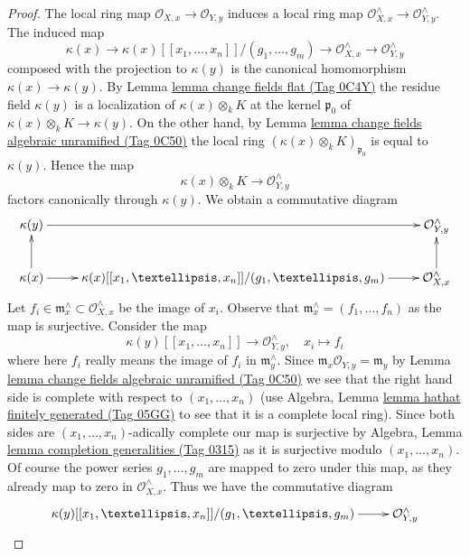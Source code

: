 \documentclass{amsart}
\theoremstyle{plain}
\theoremstyle{definition}
\theoremstyle{remark}
\numberwithin{equation}{subsection}
\begin{document}
\begin{proof}
The local ring map $\mathcal{O}_{X, x} \to \mathcal{O}_{Y, y}$
induces a local ring map
$\mathcal{O}_{X, x}^\wedge \to \mathcal{O}_{Y, y}^\wedge$.
The induced map
$$
\kappa(x) \to \kappa(x)[[x_1, \ldots, x_n]]/(g_1, \ldots, g_m)
\to \mathcal{O}_{X, x}^\wedge \to \mathcal{O}_{Y, y}^\wedge
$$
composed with the projection to $\kappa(y)$ is the canonical
homomorphism $\kappa(x) \to \kappa(y)$.
By Lemma \href{https://stacks.math.columbia.edu/tag/0C4Y}{lemma change fields flat (Tag 0C4Y)} the residue field
$\kappa(y)$ is a localization of $\kappa(x) \otimes_k K$
at the kernel $\mathfrak p_0$ of $\kappa(x) \otimes_k K \to \kappa(y)$.
On the other hand, by Lemma \href{https://stacks.math.columbia.edu/tag/0C50}{lemma change fields algebraic unramified (Tag 0C50)}
the local ring $(\kappa(x) \otimes_k K)_{\mathfrak p_0}$
is equal to $\kappa(y)$. Hence the map
$$
\kappa(x) \otimes_k K \to \mathcal{O}_{Y, y}^\wedge
$$
factors canonically through $\kappa(y)$. We obtain a commutative
diagram
$$
\xymatrix{
\kappa(y) \ar[rr] & & \mathcal{O}_{Y, y}^\wedge \\
\kappa(x) \ar[r] \ar[u] &
\kappa(x)[[x_1, \ldots, x_n]]/(g_1, \ldots, g_m) \ar[r] &
\mathcal{O}_{X, x}^\wedge \ar[u]
}
$$
Let $f_i \in \mathfrak m_x^\wedge \subset \mathcal{O}_{X, x}^\wedge$
be the image of $x_i$. Observe that
$\mathfrak  m_x^\wedge = (f_1, \ldots, f_n)$ as the map is surjective.
Consider the map
$$
\kappa(y)[[x_1, \ldots, x_n]] \longrightarrow \mathcal{O}_{Y, y}^\wedge,\quad
x_i \longmapsto f_i
$$
where here $f_i$ really means the image of $f_i$ in $\mathfrak m_y^\wedge$.
Since $\mathfrak m_x \mathcal{O}_{Y, y} = \mathfrak m_y$
by Lemma \href{https://stacks.math.columbia.edu/tag/0C50}{lemma change fields algebraic unramified (Tag 0C50)}
we see that the right hand side is complete with respect to
$(x_1, \ldots, x_n)$ (use Algebra, Lemma
\href{https://stacks.math.columbia.edu/tag/05GG}{lemma hathat finitely generated (Tag 05GG)} to see that
it is a complete local ring).
Since both sides are $(x_1, \ldots, x_n)$-adically complete
our map is surjective by
Algebra, Lemma \href{https://stacks.math.columbia.edu/tag/0315}{lemma completion generalities (Tag 0315)}
as it is surjective modulo $(x_1, \ldots, x_n)$.
Of course the power series $g_1, \ldots, g_m$
are mapped to zero under this map, as they already map to zero
in $\mathcal{O}_{X, x}^\wedge$. Thus we have the commutative diagram
$$
\xymatrix{
\kappa(y)[[x_1, \ldots, x_n]]/(g_1, \ldots, g_m) \ar[r] &
\mathcal{O}_{Y, y}^\wedge \\
}$$
\end{proof}
\end{document}
